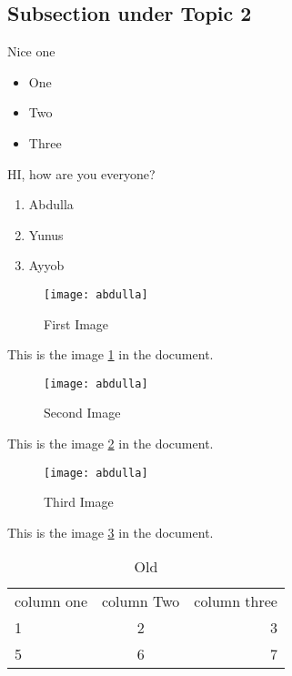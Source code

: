 \documentclass{article}
\begin{document}
\subsection{Subsection under Topic 2}
Nice one
\newpage
\begin{landscape}
	\begin{itemize}
		\item One
		\item Two
		\item Three
	\end{itemize}

	HI, how are you everyone?

	\begin{enumerate}
		\item Abdulla
		\item Yunus
		\item Ayyob
	\end{enumerate}
\end{landscape}
\newpage

\begin{figure}[h!]
	\centering
	\texttt{[image: abdulla]}
	\caption{First Image}
	\label{fig:123}
\end{figure}
This is the image \ref{fig:123} in the document.

\newpage

\begin{figure}[t!]
	\begin{center}
		\texttt{[image: abdulla]}
		\caption{Second Image}
		\label{fig:456}
	\end{center}
\end{figure}

This is the image \ref{fig:456} in the document.
\newpage

\begin{figure}[b!]
	\begin{flushright}
		\texttt{[image: abdulla]}
		\caption{Third Image}
		\label{fig:789}
	\end{flushright}
\end{figure}

This is the image \ref{fig:789} in the document.

\newpage

\begin{table}
	\begin{tabular}{lcr}
		column one & column Two & column three \\
		1 & 2 & 3 \\
		5 & 6 & 7 \\
	\end{tabular}
	\caption{Old}
	\label{tab:123}
\end{table}
\end{document}

